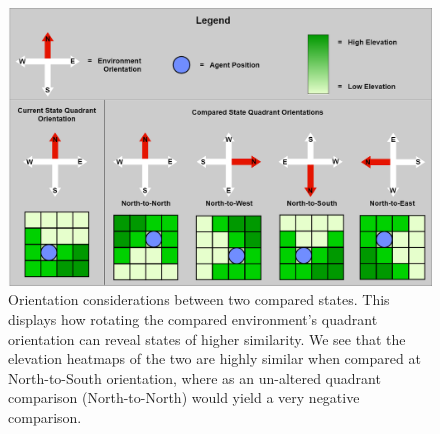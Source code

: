 
\begin{figure}[!htb]
  \centering
  \includegraphics[width=1.0\columnwidth]{Figures/quadrant_orientations.png}
  \caption[State Comparison Orientations]{Orientation considerations between two compared states. This displays how rotating the compared environment's quadrant orientation can reveal states of higher similarity. We see that the elevation heatmaps of the two are highly similar when compared at North-to-South orientation, where as an un-altered quadrant comparison (North-to-North) would yield a very negative comparison.}
  \label{fig:quadrant_orientations}
\end{figure}

